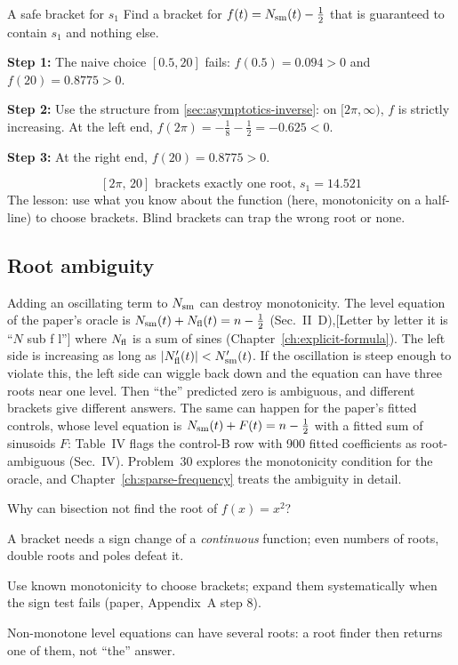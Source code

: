 \begin{sample}{A safe bracket for $s_1$}
Find a bracket for $f(t)=N_{\mathrm{sm}}(t)-\tfrac12$ that is guaranteed to contain $s_1$ and nothing else.

\textbf{Step 1:} The naive choice $[0.5,20]$ fails: $f(0.5)=0.094>0$ and $f(20)=0.8775>0$.

\textbf{Step 2:} Use the structure from \cref{sec:asymptotics-inverse}: on $[2\pi,\infty)$, $f$ is strictly increasing. At the left end, $f(2\pi)=-\tfrac18-\tfrac12=-0.625<0$.

\textbf{Step 3:} At the right end, $f(20)=0.8775>0$.

\[
\boxed{[2\pi,\,20]\text{ brackets exactly one root, }s_1=14.521}
\]
The lesson: use what you know about the function (here, monotonicity on a half-line) to choose brackets. Blind brackets can trap the wrong root or none.
\end{sample}

\subsection{Root ambiguity}

Adding an oscillating term to $N_{\mathrm{sm}}$ can destroy monotonicity. The level equation of the paper's oracle is $N_{\mathrm{sm}}(t)+N_{\mathrm{fl}}(t)=n-\tfrac12$ (Sec.~II~D),[Letter by letter it is ``$N$ sub f l''] where $N_{\mathrm{fl}}$ is a sum of sines (Chapter~\ref{ch:explicit-formula}). The left side is increasing as long as $\left\lvert N_{\mathrm{fl}}'(t)\right\rvert<N_{\mathrm{sm}}'(t)$. If the oscillation is steep enough to violate this, the left side can wiggle back down and the equation can have three roots near one level. Then ``the'' predicted zero is ambiguous, and different brackets give different answers. The same can happen for the paper's fitted controls, whose level equation is $N_{\mathrm{sm}}(t)+F(t)=n-\tfrac12$ with a fitted sum of sinusoids $F$: Table~IV flags the control-B row with 900 fitted coefficients as root-ambiguous (Sec.~IV). Problem~30 explores the monotonicity condition for the oracle, and Chapter~\ref{ch:sparse-frequency} treats the ambiguity in detail.

\begin{checkpoint}
Why can bisection not find the root of $f(x)=x^2$?
\end{checkpoint}

\begin{keyideas}
\item A bracket needs a sign change of a \emph{continuous} function; even numbers of roots, double roots and poles defeat it.
\item Use known monotonicity to choose brackets; expand them systematically when the sign test fails (paper, Appendix~A step 8).
\item Non-monotone level equations can have several roots: a root finder then returns one of them, not ``the'' answer.
\end{keyideas}

